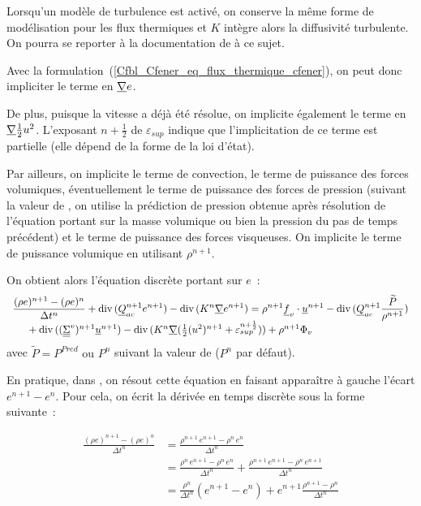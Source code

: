 Lorsqu'un modèle de turbulence est activé, on conserve la même forme
de modélisation pour les flux thermiques et $K$ intègre alors
la diffusivité turbulente. On pourra se reporter à
la documentation de  à ce sujet.

Avec la formulation~(\ref{Cfbl_Cfener_eq_flux_thermique_cfener}),
on peut donc impliciter le terme en $\underline{\nabla}{e}$.

\bigskip
De plus, puisque la vitesse a
déjà été résolue, on implicite également le terme en
$\underline{\nabla}{\frac{1}{2} u^2}$. L'exposant $n+\frac{1}{2}$ de $\varepsilon_{sup}$
indique que l'implicitation de ce terme est partielle (elle dépend de la forme
de la loi d'état).

Par ailleurs, on implicite le terme de convection, le terme de puissance
des forces volumiques, éventuellement le terme de puissance des forces de
pression (suivant la valeur de , on utilise la prédiction de
pression obtenue après résolution de l'équation portant sur la masse
volumique ou bien la pression du pas de temps précédent)
et le terme de puissance des forces visqueuses. On implicite le terme de puissance
volumique en utilisant $\rho^{n+1}$.

\bigskip
On obtient alors l'équation discrète portant sur $e$~:
\begin{equation}\label{Cfbl_Cfener_eq_energie_totale_cfener}
\begin{array}{l}
\displaystyle\frac{(\rho e)^{n+1} - (\rho e)^n}{\Delta t^n}
+ \text{div}\,(\underline{Q}_{ac}^{n+1} e^{n+1}) - \text{div}\,(K^n \underline{\nabla}{e^{n+1}})
= \rho^{n+1} \underline{f}_v \cdot \underline{u}^{n+1}
- \text{div}\,(\underline{Q}_{ac}^{n+1} \displaystyle\frac{\widetilde{P}}{\rho^{n+1}} )\\
\text{\ \ \ \ }+ \text{div}\,((\underline{\underline{\Sigma}}^v)^{n+1} \underline{u}^{n+1})
- \text{div}\,(K^n \underline{\nabla}(\frac{1}{2} (u^2)^{n+1}
+ \varepsilon_{sup}^{n+\frac{1}{2}}))
+ \rho^{n+1}\Phi_v\\
\end{array}
\end{equation}
avec $\widetilde{P}=P^{Pred}\text{ ou }P^n$ suivant la valeur de 
($P^n$ par défaut).

En pratique, dans \CS, on résout cette équation en faisant apparaître à
gauche l'écart $e^{n+1} - e^n$. Pour cela, on écrit la dérivée
en temps discrète sous la forme suivante~:

\begin{equation}
\begin{array}{ll}
\displaystyle
\frac{(\rho e)^{n+1} - (\rho e)^n}{\Delta t^n}
& =
\displaystyle
\frac{\rho^{n+1}\, e^{n+1} - \rho^n\, e^n}{\Delta t^n}\\
& =
\displaystyle
\frac{\rho^{n}\, e^{n+1} - \rho^n\, e^n}{\Delta t^n}+
\frac{\rho^{n+1}\, e^{n+1} - \rho^n\, e^{n+1}}{\Delta t^n}\\
& =
\displaystyle
\frac{\rho^{n}}{\Delta t^n}\left(e^{n+1} - e^n\right)+
e^{n+1}\frac{\rho^{n+1} - \rho^n}{\Delta t^n}
\end{array}
\end{equation}

